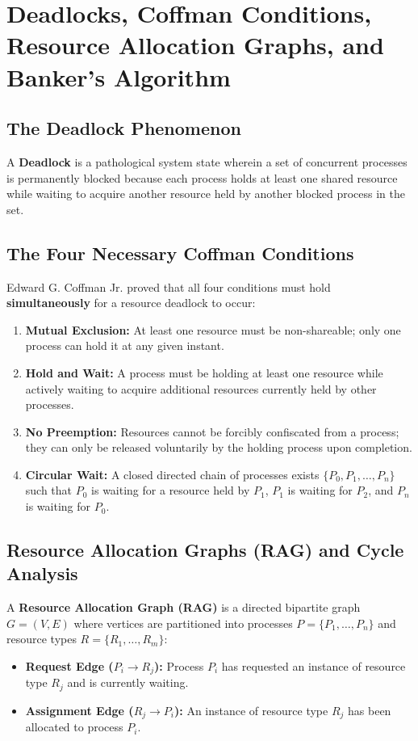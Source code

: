 \section{Deadlocks, Coffman Conditions, Resource Allocation Graphs, and Banker's Algorithm}
\label{sec:os_deadlocks}

\subsection{The Deadlock Phenomenon}
A \textbf{Deadlock} is a pathological system state wherein a set of concurrent processes is permanently blocked because each process holds at least one shared resource while waiting to acquire another resource held by another blocked process in the set.

\subsection{The Four Necessary Coffman Conditions}
Edward G. Coffman Jr. proved that all four conditions must hold \textbf{simultaneously} for a resource deadlock to occur:
\begin{enumerate}
    \item \textbf{Mutual Exclusion:} At least one resource must be non-shareable; only one process can hold it at any given instant.
    \item \textbf{Hold and Wait:} A process must be holding at least one resource while actively waiting to acquire additional resources currently held by other processes.
    \item \textbf{No Preemption:} Resources cannot be forcibly confiscated from a process; they can only be released voluntarily by the holding process upon completion.
    \item \textbf{Circular Wait:} A closed directed chain of processes exists $\{P_0, P_1, \dots, P_n\}$ such that $P_0$ is waiting for a resource held by $P_1$, $P_1$ is waiting for $P_2$, and $P_n$ is waiting for $P_0$.
\end{enumerate}

\subsection{Resource Allocation Graphs (RAG) and Cycle Analysis}
A \textbf{Resource Allocation Graph (RAG)} is a directed bipartite graph $G = (V, E)$ where vertices are partitioned into processes $P = \{P_1, \dots, P_n\}$ and resource types $R = \{R_1, \dots, R_m\}$:
\begin{itemize}
    \item \textbf{Request Edge ($P_i \to R_j$):} Process $P_i$ has requested an instance of resource type $R_j$ and is currently waiting.
    \item \textbf{Assignment Edge ($R_j \to P_i$):} An instance of resource type $R_j$ has been allocated to process $P_i$.
\end{itemize}

